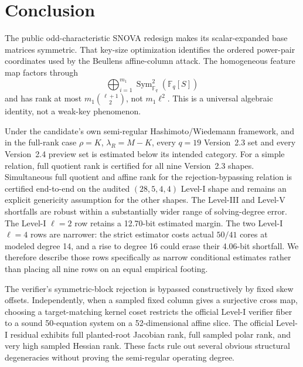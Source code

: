\documentclass[11pt]{article}
\newcommand{\F}{\mathbb F}
\newcommand{\Sym}{\operatorname{Sym}}
\newcommand{\SNOVA}{\textsf{SNOVA}}
\begin{document}
\section{Conclusion}\label{sec:conclusion}

The public odd-characteristic \SNOVA{} redesign makes its scalar-expanded base matrices symmetric.  That key-size optimization identifies the ordered power-pair coordinates used by the Beullens affine-column attack.  The homogeneous feature map factors through
\[
 \bigoplus_{i=1}^{m_1}\Sym^2_{\F_q}(\F_q[S])
\]
and has rank at most $m_1\binom{\ell+1}{2}$, not $m_1\ell^2$.  This is a universal algebraic identity, not a weak-key phenomenon.

Under the candidate's own semi-regular Hashimoto/Wiedemann framework, and in
the full-rank case $\rho=K$, $\lambda_R=M-K$, every $q=19$ Version~2.3 set and
every Version~2.4 preview set is estimated below its intended category.  For a simple relation, full quotient rank is certified for all nine
Version~2.3 shapes.  Simultaneous full quotient and affine rank for the
rejection-bypassing relation is certified end-to-end on the audited
$(28,5,4,4)$ Level-I shape and remains an explicit genericity assumption for
the other shapes.  The Level-III and Level-V
shortfalls are robust within a substantially wider range of solving-degree
error.  The Level-I $\ell=2$ row retains a 12.70-bit estimated margin.  The two
Level-I $\ell=4$ rows are narrower: the strict estimator costs actual $50/41$
cores at modeled degree 14, and a rise to degree 16 could erase their 4.06-bit
shortfall.  We therefore describe those rows specifically as narrow conditional
estimates rather than placing all nine rows on an equal empirical footing.

The verifier's symmetric-block rejection is bypassed constructively by fixed
skew offsets.  Independently, when a sampled fixed column gives a surjective
cross map, choosing a target-matching kernel coset restricts the official
Level-I verifier fiber to a sound 50-equation system on a 52-dimensional affine
slice.  The official Level-I residual exhibits full planted-root Jacobian rank,
full sampled polar rank, and very high sampled Hessian rank.  These facts rule
out several obvious structural degeneracies without proving the semi-regular
operating degree.
\end{document}
